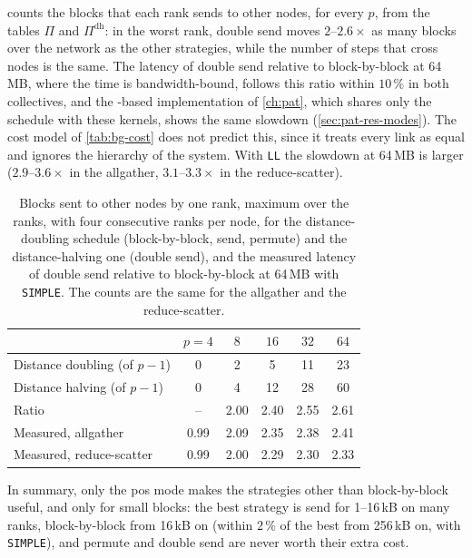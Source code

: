  counts the blocks that each rank sends to other nodes, for every $p$, from the tables $\Pi$ and $\Pi^{\mathrm{dh}}$: in the worst rank, double send moves $2$--$2.6\times$ as many blocks over the network as the other strategies, while the number of steps that cross nodes is the same.
The latency of double send relative to block-by-block at 64\,MB, where the time is bandwidth-bound, follows this ratio within $10\,\%$ in both collectives, and the \pat{}-based implementation of \cref{ch:pat}, which shares only the schedule with these kernels, shows the same slowdown (\cref{sec:pat-res-modes}).
The cost model of \cref{tab:bg-cost} does not predict this, since it treats every link as equal and ignores the hierarchy of the system.
With \texttt{LL} the slowdown at 64\,MB is larger ($2.9$--$3.6\times$ in the allgather, $3.1$--$3.3\times$ in the reduce-scatter).
\begin{table}[htbp]
\centering
\small
\setlength{\tabcolsep}{5pt}
\caption{Blocks sent to other nodes by one rank, maximum over the ranks, with four consecutive ranks per node, for the distance-doubling schedule (block-by-block, send, permute) and the distance-halving one (double send), and the measured latency of double send relative to block-by-block at 64\,MB with \texttt{SIMPLE}. The counts are the same for the allgather and the reduce-scatter.}
\label{tab:bfly-internode}
\begin{tabular}{@{}l ccccc@{}}
\toprule
 & $p=4$ & $8$ & $16$ & $32$ & $64$ \\
\midrule
Distance doubling (of $p-1$)   & 0 & 2 & 5  & 11 & 23 \\
Distance halving (of $p-1$)    & 0 & 4 & 12 & 28 & 60 \\
Ratio                          & -- & 2.00 & 2.40 & 2.55 & 2.61 \\
\midrule
Measured, allgather            & 0.99 & 2.09 & 2.35 & 2.38 & 2.41 \\
Measured, reduce-scatter       & 0.99 & 2.00 & 2.29 & 2.30 & 2.33 \\
\bottomrule
\end{tabular}
\end{table}

In summary, only the pos mode makes the strategies other than block-by-block useful, and only for small blocks: the best \bine{} strategy is send for 1--16\,kB on many ranks, block-by-block from 16\,kB on (within $2\,\%$ of the best from 256\,kB on, with \texttt{SIMPLE}), and permute and double send are never worth their extra cost.
